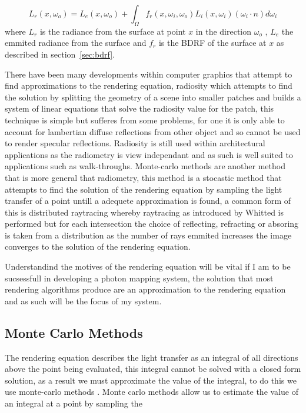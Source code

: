 \begin{equation}
L_{r}(x, \omega_{o}) = L_{e}(x, \omega_{o})
					 +
					   \int_{\Omega}
					 		f_{r}(x, \omega_{i}, \omega_{o})
							L_i(x, \omega_{i})
							(\omega_{i} \cdot n)d\omega_{i}
\end{equation}
where $L_{r}$ is the radiance from the surface at point $x$  in the direction $\omega_o$ ,
$L_{e}$ the emmited radiance from the surface and $f_{r}$
is the BDRF of the surface at $x$ as described in section~\ref{sec:bdrf}.

There have been many developments within computer graphics that attempt to find approximations
to the rendering equation, radiosity \cite{Goral85}which attempts to find the solution by splitting 
the geometry of a scene into smaller patches and builds a system of linear equations that solve the 
radiosity value for the patch, this technique is simple but sufferes from some problems, for one it 
is only able to account for lambertian diffuse reflections from other object and so cannot be used
to render specular reflections. Radiosity is still used within architectural applications as the
radiometry is view independant and as such is well suited to applications such as walk-throughs.
Monte-carlo methods are another method that is more general that radiometry, this method is a
stocastic method that attempts to find the solution of the rendering equation by sampling the light
transfer of a point untill a adequete approximation is found, a common form of this is distributed
raytracing whereby raytracing as introduced by Whitted \cite{whitted79a} is performed but for each
intersection the choice of reflecting, refracting or absoring is taken from a distribution as the
number of rays emmited increases the image converges to the solution of the rendering equation.

Understandind the motives of the rendering equation will be vital if I am to be sucsessfull in
developing a photon mapping system, the solution that most rendering algorithms produce are an
approximation to the rendering equation and as such will be the focus of my system.

\subsection{Monte Carlo Methods}
The rendering equation describes the light transfer as an integral of all directions above the point being evaluated, this
integral cannot be solved with a closed form solution, as a result we must approximate the value of the integral, to do this
we use monte-carlo methods \cite{wood-monte-carlo}. Monte carlo methods allow us to estimate the value of an integral at a point
by sampling the 

